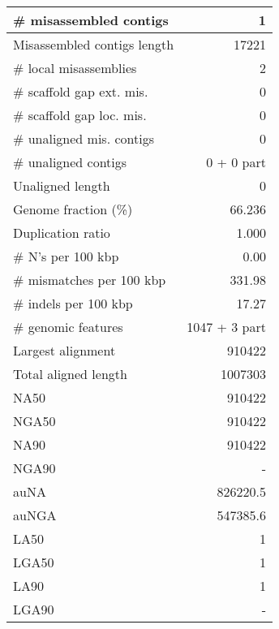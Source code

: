 \documentclass[12pt,a4paper]{article}
\begin{document}
\begin{table}[ht]
\begin{center}
\begin{tabular}{|l*{1}{|r}|}
\# misassembled contigs & 1 \\ \hline
Misassembled contigs length & 17221 \\ \hline
\# local misassemblies & 2 \\ \hline
\# scaffold gap ext. mis. & 0 \\ \hline
\# scaffold gap loc. mis. & 0 \\ \hline
\# unaligned mis. contigs & 0 \\ \hline
\# unaligned contigs & 0 + 0 part \\ \hline
Unaligned length & 0 \\ \hline
Genome fraction (\%) & 66.236 \\ \hline
Duplication ratio & 1.000 \\ \hline
\# N's per 100 kbp & 0.00 \\ \hline
\# mismatches per 100 kbp & 331.98 \\ \hline
\# indels per 100 kbp & 17.27 \\ \hline
\# genomic features & 1047 + 3 part \\ \hline
Largest alignment & 910422 \\ \hline
Total aligned length & 1007303 \\ \hline
NA50 & 910422 \\ \hline
NGA50 & 910422 \\ \hline
NA90 & 910422 \\ \hline
NGA90 & - \\ \hline
auNA & 826220.5 \\ \hline
auNGA & 547385.6 \\ \hline
LA50 & 1 \\ \hline
LGA50 & 1 \\ \hline
LA90 & 1 \\ \hline
LGA90 & - \\ \hline
\end{tabular}
\end{center}
\end{table}
\end{document}
